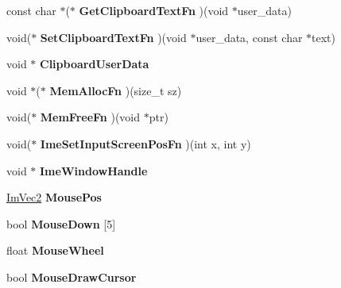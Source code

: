 \begin{DoxyCompactItemize}
const char $\ast$($\ast$ {\bfseries Get\+Clipboard\+Text\+Fn} )(void $\ast$user\+\_\+data)
\item 
\mbox{\label{struct_im_gui_i_o_a1ee9c0763df33f7f3a9819235ce85078}} 
void($\ast$ {\bfseries Set\+Clipboard\+Text\+Fn} )(void $\ast$user\+\_\+data, const char $\ast$text)
\item 
\mbox{\label{struct_im_gui_i_o_a162d9da988e8985df05d262640f2f91c}} 
void $\ast$ {\bfseries Clipboard\+User\+Data}
\item 
\mbox{\label{struct_im_gui_i_o_a352f6f0770974ee173f84d99d9e50a6e}} 
void $\ast$($\ast$ {\bfseries Mem\+Alloc\+Fn} )(size\+\_\+t sz)
\item 
\mbox{\label{struct_im_gui_i_o_adb56df4e96ab8a9f1aefe8dd474ba0f5}} 
void($\ast$ {\bfseries Mem\+Free\+Fn} )(void $\ast$ptr)
\item 
\mbox{\label{struct_im_gui_i_o_ac59559342608fbdeb14778a4fd57c301}} 
void($\ast$ {\bfseries Ime\+Set\+Input\+Screen\+Pos\+Fn} )(int x, int y)
\item 
\mbox{\label{struct_im_gui_i_o_a8baa252c4f76764eb866b920f227cfa2}} 
void $\ast$ {\bfseries Ime\+Window\+Handle}
\item 
\mbox{\label{struct_im_gui_i_o_ad2e9e547cb4d2abe8e7d27407efffeb8}} 
\hyperlink{struct_im_vec2}{Im\+Vec2} {\bfseries Mouse\+Pos}
\item 
\mbox{\label{struct_im_gui_i_o_a8f4613baafc93026175d9cdaf4e82d21}} 
bool {\bfseries Mouse\+Down} \mbox{[}5\mbox{]}
\item 
\mbox{\label{struct_im_gui_i_o_a21d3ca4928989a2c838b7b4ea95e5824}} 
float {\bfseries Mouse\+Wheel}
\item 
\mbox{\label{struct_im_gui_i_o_a9b240460966bf2bd35c30f27b8db4028}} 
bool {\bfseries Mouse\+Draw\+Cursor}
\item 
\mbox{\label{struct_im_gui_i_o_a51de8f65dcabb80ef4e0d3c759ffcd7f}} 

\end{DoxyCompactItemize}
